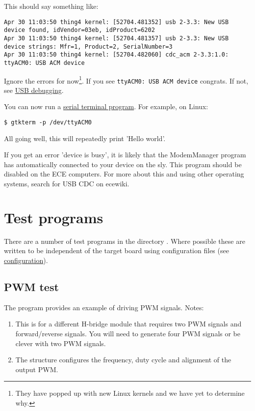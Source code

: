 This should say something like:
%
\begin{verbatim}
Apr 30 11:03:50 thing4 kernel: [52704.481352] usb 2-3.3: New USB device found, idVendor=03eb, idProduct=6202
Apr 30 11:03:50 thing4 kernel: [52704.481357] usb 2-3.3: New USB device strings: Mfr=1, Product=2, SerialNumber=3
Apr 30 11:03:50 thing4 kernel: [52704.482060] cdc_acm 2-3.3:1.0: ttyACM0: USB ACM device
\end{verbatim}

Ignore the errors for now\footnote{They have popped up with new Linux
  kernels and we have yet to determine why.}. If you see
\texttt{ttyACM0:\ USB\ ACM\ device} congrats. If not, see
\href{USB_debugging}{USB debugging}.

You can now run a \href{Serial_terminal_applications}{serial terminal
program}. For example, on Linux:

\begin{verbatim}
$ gtkterm -p /dev/ttyACM0
\end{verbatim}

All going well, this will repeatedly print 'Hello world'.

If you get an error 'device is busy', it is likely that the ModemManager
program has automatically connected to your device on the sly. This
program should be disabled on the ECE computers. For more about this and
using other operating systems, search for USB CDC on ecewiki.

\section{Test programs}
\label{test-programs}

There are a number of test programs in the directory
. Where possible these are written to be
independent of the target board using configuration files (see
\protect\hyperref[configuration]{configuration}).

\subsection{PWM test}
\label{pwm-test}

The program  provides an
example of driving PWM signals. Notes:
%
\begin{enumerate}
\item
  This is for a different H-bridge module that requires two PWM signals
  and forward/reverse signals. You will need to generate four PWM
  signals or be clever with two PWM signals.
\item
  The  structure configures the frequency, duty
  cycle and alignment of the output PWM.
\end{enumerate}

